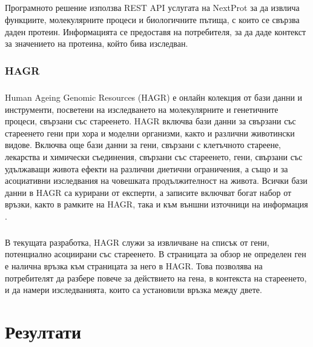 \documentclass[pdftex,cyrillic,14pt,a4page,twoside,openright]{extreport}
\begin{document}
\paragraph{}
Програмното решение използва REST API услугата на NextProt за да извлича функциите, молекулярните процеси и биологичните пътища, с които се свързва даден протеин. Информацията се предоставя на потребителя, за да даде контекст за значението на протеина, който бива изследван.

\subsection{HAGR}
\paragraph{}
Human Ageing Genomic Resources (HAGR) е онлайн колекция от бази данни и инструменти, посветени на изследването на молекулярните и генетичните процеси, свързани със стареенето. HAGR включва бази данни за свързани със стареенето гени при хора и моделни организми, както и различни животински видове. Включва още бази данни за гени, свързани с клетъчното стареене, лекарства и химически съединения, свързани със стареенето, гени, свързани със удължаващи живота ефекти на различни диетични ограничения, а също и за асоциативни изследвания на човешката продължителност на живота. Всички бази данни в HAGR са курирани от експерти, а записите включват богат набор от връзки, както в рамките на HAGR, така и към външни източници на информация \cite{tacutu2018}.

\paragraph{}
В текущата разработка, HAGR служи за извличване на списък от гени, потенциално асоциирани със стареенето. В страницата за обзор не определен ген е налична връзка към страницата за него в HAGR. Това позволява на потребителят да разбере повече за действието на гена, в контекста на стареенето, и да намери изследванията, които са установили връзка между двете.

\chapter{Резултати}
\end{document}
